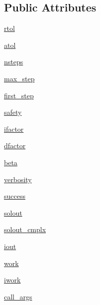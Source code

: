 \subsection*{Public Attributes}
\begin{DoxyCompactItemize}
\item 
\hyperlink{classscipy_1_1integrate_1_1__ode_1_1dopri5_a59cdc0c692cbca807b409dda5d8e2a3a}{rtol}
\item 
\hyperlink{classscipy_1_1integrate_1_1__ode_1_1dopri5_a1da94c1f65b5ded87a63a214619d7a79}{atol}
\item 
\hyperlink{classscipy_1_1integrate_1_1__ode_1_1dopri5_aeaa9f04c637aa63144bcc84e8810223b}{nsteps}
\item 
\hyperlink{classscipy_1_1integrate_1_1__ode_1_1dopri5_a0caab2463a55abd94928f44a435d52dc}{max\+\_\+step}
\item 
\hyperlink{classscipy_1_1integrate_1_1__ode_1_1dopri5_a4de057d9ff8224622b8f879b46f18b4b}{first\+\_\+step}
\item 
\hyperlink{classscipy_1_1integrate_1_1__ode_1_1dopri5_a3d38fd4e0d69dedeea279e1f68081db6}{safety}
\item 
\hyperlink{classscipy_1_1integrate_1_1__ode_1_1dopri5_a52714199de1e4de95362a599bba301da}{ifactor}
\item 
\hyperlink{classscipy_1_1integrate_1_1__ode_1_1dopri5_a793634bd465917d992d0d74d2c3da026}{dfactor}
\item 
\hyperlink{classscipy_1_1integrate_1_1__ode_1_1dopri5_ae22a4a2aecfbc3ec68cd223c3e91c04f}{beta}
\item 
\hyperlink{classscipy_1_1integrate_1_1__ode_1_1dopri5_ac36a3e3de8e463ec03b5c813b0a9fa44}{verbosity}
\item 
\hyperlink{classscipy_1_1integrate_1_1__ode_1_1dopri5_aebfc161d892da4d62f85cd22543dd8a1}{success}
\item 
\hyperlink{classscipy_1_1integrate_1_1__ode_1_1dopri5_a49368fb726c1c3d6410f9c29baf6ffad}{solout}
\item 
\hyperlink{classscipy_1_1integrate_1_1__ode_1_1dopri5_ac245f5286c8cad199c4a7106cf1b766f}{solout\+\_\+cmplx}
\item 
\hyperlink{classscipy_1_1integrate_1_1__ode_1_1dopri5_a5f0ac27c72cde5094121b862d701c50a}{iout}
\item 
\hyperlink{classscipy_1_1integrate_1_1__ode_1_1dopri5_a2854f6ec14b10a82bbc0b5b5499573c5}{work}
\item 
\hyperlink{classscipy_1_1integrate_1_1__ode_1_1dopri5_a0337a0c4e947f320d2f9b37c109fdd35}{iwork}
\item 
\hyperlink{classscipy_1_1integrate_1_1__ode_1_1dopri5_ae0b51e11b0fbf9aa18c380626456d275}{call\+\_\+args}
\end{DoxyCompactItemize}
